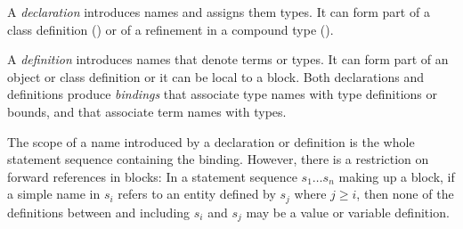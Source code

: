 A {\em declaration} introduces names and assigns them types. It can
form part of a class definition () or of a
refinement in a compound type ().

A {\em definition} introduces names that denote terms or types. It can
form part of an object or class definition or it can be local to a
block.  Both declarations and definitions produce {\em bindings} that
associate type names with type definitions or bounds, and that
associate term names with types.

The scope of a name introduced by a declaration or definition is the
whole statement sequence containing the binding.  However, there is a
restriction on forward references in blocks: In a statement sequence
$s_1 \ldots s_n$ making up a block, if a simple name in $s_i$ refers
to an entity defined by $s_j$ where $j \geq i$, then none of the
definitions between and including $s_i$ and $s_j$ may be a value or
variable definition.

